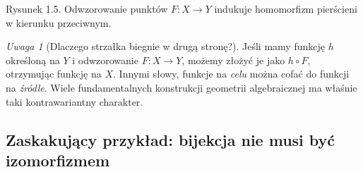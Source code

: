 \documentclass[11pt,a4paper,openany]{report}
\numberwithin{equation}{section}
\theoremstyle{plain}
\theoremstyle{definition}
\theoremstyle{remark}
\newtheorem{uwaga}[twierdzenie]{Uwaga}
\begin{document}
\begin{center}
\end{center}
\begin{center}\small Rysunek 1.5. Odwzorowanie punktów $F:X\to Y$ indukuje homomorfizm pierścieni w kierunku przeciwnym.\end{center}

\begin{uwaga}[Dlaczego strzałka biegnie w drugą stronę?]
Jeśli mamy funkcję $h$ określoną na $Y$ i odwzorowanie
$F:X\to Y$, możemy złożyć je jako $h\circ F$,
otrzymując funkcję na $X$. Innymi słowy, funkcje na \emph{celu}
można cofać do funkcji na \emph{źródle}.
Wiele fundamentalnych konstrukcji geometrii algebraicznej
ma właśnie taki kontrawariantny charakter.
\end{uwaga}

\subsection{Zaskakujący przykład: bijekcja nie musi być izomorfizmem}
\end{document}
